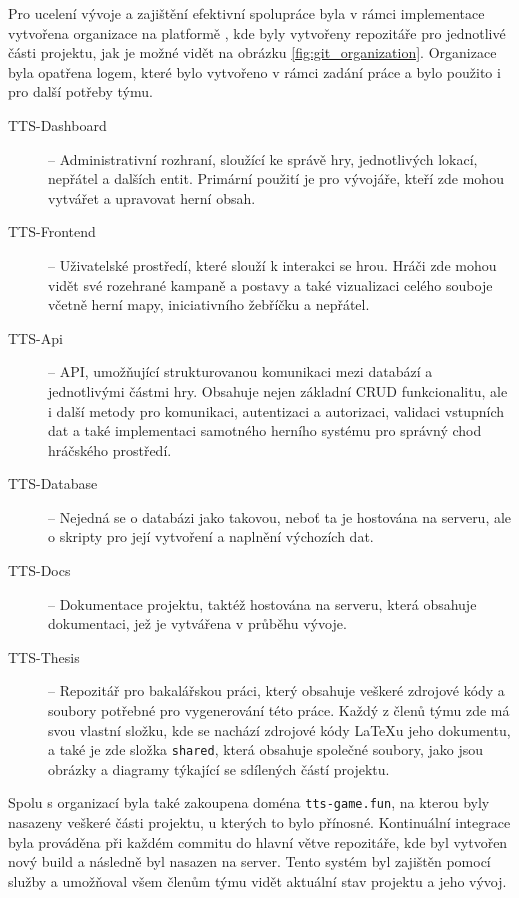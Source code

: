 Pro ucelení vývoje a zajištění efektivní spolupráce byla v rámci implementace vytvořena organizace  na platformě , kde byly vytvořeny repozitáře pro jednotlivé části projektu, jak je možné vidět na obrázku \ref{fig:git_organization}. Organizace byla opatřena logem, které bylo vytvořeno v rámci zadání práce a bylo použito i pro další potřeby týmu.

\begin{description}
    \item [TTS-Dashboard] -- Administrativní rozhraní, sloužící ke správě hry, jednotlivých lokací, nepřátel a dalších entit. Primární použití je pro vývojáře, kteří zde mohou vytvářet a upravovat herní obsah.
    \item [TTS-Frontend] -- Uživatelské prostředí, které slouží k interakci se hrou. Hráči zde mohou vidět své rozehrané kampaně a postavy a také vizualizaci celého souboje včetně herní mapy, iniciativního žebříčku a nepřátel.
    \item [TTS-Api] -- API, umožňující strukturovanou komunikaci mezi databází a jednotlivými částmi hry. Obsahuje nejen základní CRUD funkcionalitu, ale i další metody pro komunikaci, autentizaci a autorizaci, validaci vstupních dat a také implementaci samotného herního systému pro správný chod hráčského prostředí.
    \item [TTS-Database] -- Nejedná se o databázi jako takovou, neboť ta je hostována na serveru, ale o skripty pro její vytvoření a naplnění výchozích dat.
    \item [TTS-Docs] -- Dokumentace projektu, taktéž hostována na serveru, která obsahuje dokumentaci, jež je vytvářena v průběhu vývoje.
    \item [TTS-Thesis] -- Repozitář pro bakalářskou práci, který obsahuje veškeré zdrojové kódy a soubory potřebné pro vygenerování této práce. Každý z členů týmu zde má svou vlastní složku, kde se nachází zdrojové kódy \LaTeX{u} jeho dokumentu, a také je zde složka \texttt{shared}, která obsahuje společné soubory, jako jsou obrázky a diagramy týkající se sdílených částí projektu. 
\end{description}

Spolu s organizací byla také zakoupena doména \texttt{tts-game.fun}, na kterou byly nasazeny veškeré části projektu, u kterých to bylo přínosné. Kontinuální integrace byla prováděna při každém commitu do hlavní větve repozitáře, kde byl vytvořen nový build a následně byl nasazen na server. Tento systém byl zajištěn pomocí služby  a umožňoval všem členům týmu vidět aktuální stav projektu a jeho vývoj.

